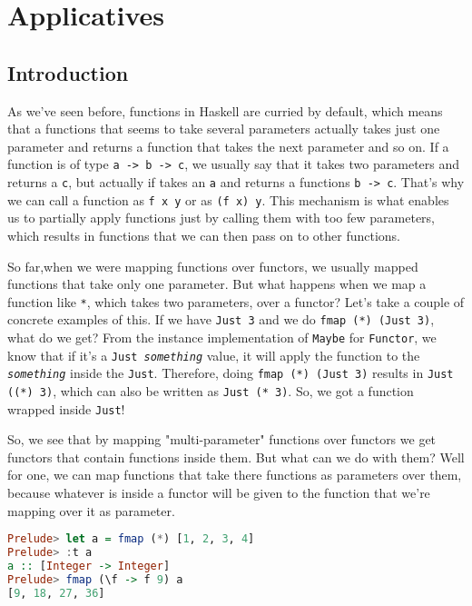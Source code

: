 \newpage
\chapter{Applicatives}
\section{Introduction}
As we've seen before, functions in Haskell are curried by default, which means that a functions that seems to take several parameters actually takes just one parameter and returns a function that takes the next parameter and so on. If a function is of type \texttt{a -> b -> c}, we usually say that it takes two parameters and returns a \texttt{c}, but actually if takes an \texttt{a} and returns a functions \texttt{b -> c}. That's why we can call a function as \texttt{f x y} or as \texttt{(f x) y}. This mechanism is what enables us to partially apply functions just by calling them with too few parameters, which results in functions that we can then pass on to other functions. 
\linebreak \linebreak

So far,when we were mapping functions over functors, we usually mapped functions that take only one parameter. But what happens when we map a function like \texttt{*}, which takes two parameters, over a functor? Let's take a couple of concrete examples of this. If we have \texttt{Just 3} and we do \texttt{fmap (*) (Just 3)}, what do we get? From the instance implementation of \texttt{Maybe} for \texttt{Functor}, we know that if it's a \texttt{Just \textit{something}} value, it will apply the function to the \texttt{\textit{something}} inside the \texttt{Just}. Therefore, doing \texttt{fmap (*) (Just 3)} results in \texttt{Just ((*) 3)}, which can also be written as \texttt{Just (* 3)}. So, we got a function wrapped inside \texttt{Just}!
\linebreak \linebreak

So, we see that by mapping "multi-parameter" functions over functors we get functors that contain functions inside them. But what can we do with them? Well for one, we can map functions that take there functions as parameters over them, because whatever is inside a functor will be given to the function that we're mapping over it as parameter. 

\begin{lstlisting}[language=haskell]
Prelude> let a = fmap (*) [1, 2, 3, 4]
Prelude> :t a
a :: [Integer -> Integer]
Prelude> fmap (\f -> f 9) a
[9, 18, 27, 36]
\end{lstlisting}

